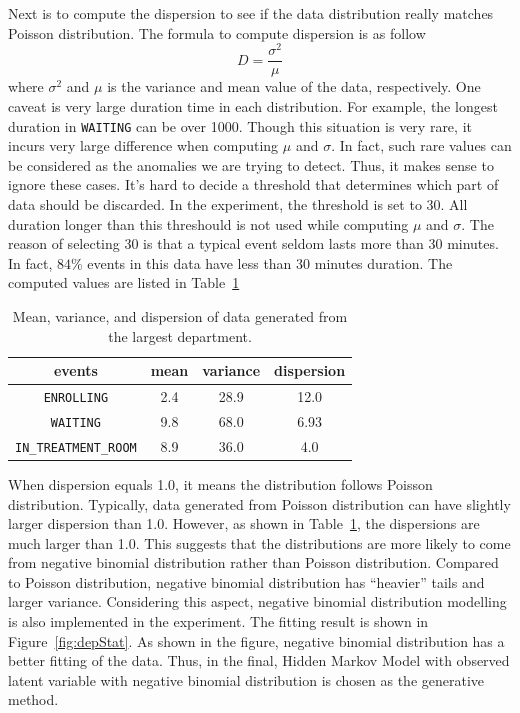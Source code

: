 Next is to compute the dispersion to see if the data distribution really matches Poisson distribution. The formula to compute dispersion is as follow
\begin{equation*}
	D = \frac{\sigma^2}{\mu}
\end{equation*}
where $\sigma^2$ and $\mu$ is the variance and mean value of the data, respectively. One caveat is very large duration time in each distribution. For example, the longest duration in \texttt{WAITING} can be over 1000. Though this situation is very rare, it incurs very large difference when computing $\mu$ and $\sigma$. In fact, such rare values can be considered as the anomalies we are trying to detect. Thus, it makes sense to ignore these cases. It's hard to decide a threshold that determines which part of data should be discarded. In the experiment, the threshold is set to 30. All duration longer than this threshould is not used while computing $\mu$ and $\sigma$. The reason of selecting 30 is that a typical event seldom lasts more than 30 minutes. In fact, $84\%$ events in this data have less than 30 minutes duration. The computed values are listed in Table~\ref{tab:dispersion}
\begin{table}[!ht]
	\caption{Mean, variance, and dispersion of data generated from the largest department.}
	\begin{center}
		\begin{tabular}{|c|c|c|c|}
			\hline
			events & mean & variance & dispersion \\ \hline
			\texttt{ENROLLING}	& 2.4 & 28.9 & 12.0 \\ \hline
			\texttt{WAITING} & 9.8 & 68.0 & 6.93 \\ \hline
			\texttt{IN\_TREATMENT\_ROOM} & 8.9 & 36.0 & 4.0 \\ 
			\hline
		\end{tabular}
	\end{center}
	\label{tab:dispersion}
\end{table}
When dispersion equals 1.0, it means the distribution follows Poisson distribution. Typically, data generated from Poisson distribution can have slightly larger dispersion than 1.0. However, as shown in Table~\ref{tab:dispersion}, the dispersions are much larger than 1.0. This suggests that the distributions are more likely to come from negative binomial distribution rather than Poisson distribution. Compared to Poisson distribution, negative binomial distribution has ``heavier'' tails and larger variance. Considering this aspect, negative binomial distribution modelling is also implemented in the experiment. The fitting result is shown in Figure~\ref{fig:depStat}. As shown in the figure, negative binomial distribution has a better fitting of the data. Thus, in the final, Hidden Markov Model with observed latent variable with negative binomial distribution is chosen as the generative method.
